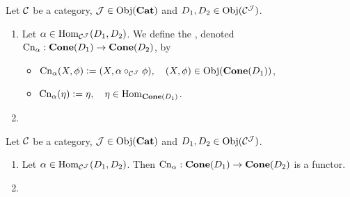 \documentclass{book}
\begin{document}
	\begin{defn} 
		Let $\MC$ be a category, $\MJ \in \Obj(\bCat)$ and $D_1, D_2 \in \Obj(\MC^{\MJ})$.
		\begin{enumerate}
			\item Let $\al \in \Hom_{\MC^{\MJ}}(D_1, D_2)$. We define the , denoted $\Cn_{\al}: \bCone(D_1) \rightarrow \bCone(D_2)$, by 
			\begin{itemize}
				\item $\Cn_{\al}(X, \phi) \defeq (X, \al \circ_{\MC^{\MJ}} \phi), \quad (X, \phi) \in \Obj(\bCone(D_1))$,
				\item $\Cn_{\al}(\eta) \defeq \eta, \quad \eta \in \Hom_{\bCone(D_1)}$.
			\end{itemize}
			\item {}
		\end{enumerate}
	\end{defn}
	
	\begin{ex} 
		Let $\MC$ be a category, $\MJ \in \Obj(\bCat)$ and $D_1, D_2 \in \Obj(\MC^{\MJ})$.
		\begin{enumerate}
			\item Let $\al \in \Hom_{\MC^{\MJ}}(D_1, D_2)$. Then $\Cn_{\al}: \bCone(D_1) \rightarrow \bCone(D_2)$ is a functor.
			\item {}
		\end{enumerate}
	\end{ex}
	
\end{document}
